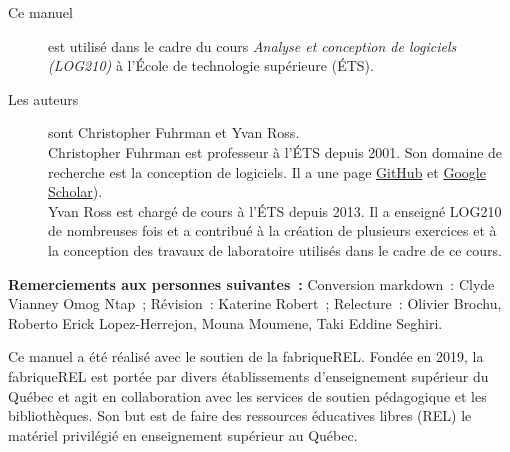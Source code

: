 \footnotesize
\begin{description}
\item[Ce manuel] est utilisé dans le cadre du cours \emph{Analyse et
conception de logiciels (LOG210)} à l'École de technologie supérieure
(ÉTS).
\item[Les auteurs]sont Christopher Fuhrman et Yvan Ross.\\
Christopher Fuhrman est professeur à l'ÉTS depuis 2001.
Son domaine de recherche est la conception de logiciels. 
Il a une page \href{https://github.com/fuhrmanator}{GitHub} et \href{https://scholar.google.com/citations?user=Qa5SpUwAAAAJ\&hl=fr\&oi=ao}{Google Scholar}).\\
Yvan Ross est chargé de cours à l'ÉTS depuis 2013. Il a enseigné LOG210 de nombreuses fois et a contribué à la création de plusieurs exercices et à la conception des travaux de laboratoire utilisés dans le cadre de ce cours.
\end{description}

\textbf{Remerciements aux personnes suivantes~:} Conversion markdown~: Clyde Vianney Omog Ntap~; Révision~: Katerine Robert~; Relecture~: Olivier Brochu, Roberto Erick Lopez-Herrejon, Mouna Moumene, Taki Eddine Seghiri. 


Ce manuel a été réalisé avec le soutien de la
fabriqueREL. Fondée en 2019, la fabriqueREL est
portée par divers établissements d’enseignement
supérieur du Québec et agit en collaboration avec
les services de soutien pédagogique et les
bibliothèques. Son but est de faire des ressources
éducatives libres (REL) le matériel privilégié en
enseignement supérieur au Québec.

